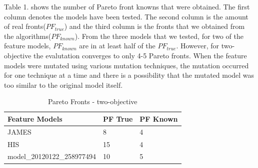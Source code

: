 \documentclass[a4paper,12pt]{article}
\begin{document}
Table 1. shows the number of Pareto front knowns that were obtained. The first column denotes the models have been tested. The second column is the amount of real fronts($PF_{true}$) and the third column is the fronts that we obtained from the algorithms($PF_{known}$). From the three models that we tested, for two of the feature models, $PF_{known}$ are in at least half of the $PF_{true}$. However, for two-objective the evalutation converges to only 4-5 Pareto fronts. When the feature models were mutated using various mutation techniques, the mutation occurred for one technique at a time and there is a possibility that the mutated model was too similar to the original model itself. \par

\begin{table}[h!]
\centering
\begin{tabular}{|l|l|l|}
\hline
\textbf{Feature Models}    & \textbf{PF True} & \textbf{PF Known} \\ \hline
JAMES                      & 8                & 4                 \\ \hline
HIS                        & 15               & 4                 \\ \hline
model\_20120122\_258977494 & 10               & 5                 \\ \hline
\end{tabular}
\caption{Pareto Fronts - two-objective}
\label{table:computerNo}
\end{table} \par
\end{document}
